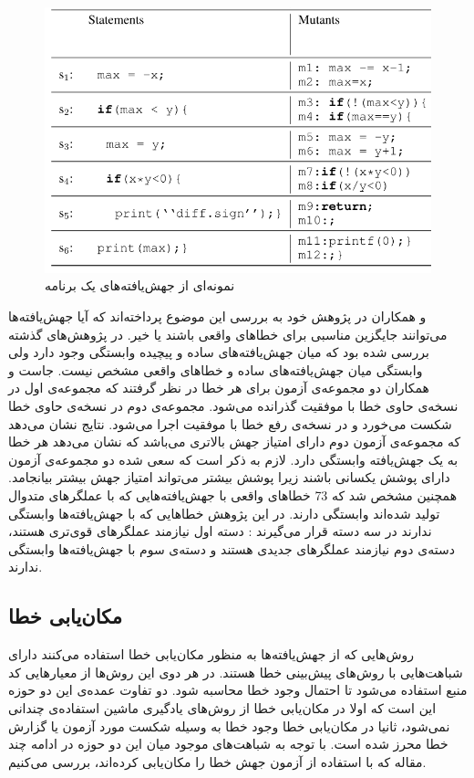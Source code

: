 \begin{figure}[H]
	\centering
	\includegraphics[width=.6\textwidth]{img/mutants.PNG}
	\caption{ نمونه‌ای از جهش‌یافته‌های یک برنامه \cite{moon2014ask}}
	\label{fig:mutant}
\end{figure}
 و همکاران در پژوهش خود به بررسی این موضوع پرداخته‌اند که آیا جهش‌یافته‌ها می‌توانند جایگزین مناسبی برای خطاهای واقعی باشند یا خیر\cite{just2014mutants}. در پژوهش‌های گذشته بررسی شده بود که میان جهش‌یافته‌های ساده و پیچیده وابستگی وجود دارد ولی وابستگی میان جهش‌یافته‌های ساده و خطاهای واقعی مشخص نیست. جاست و همکاران دو مجموعه‌ی آزمون برای هر خطا در نظر گرفتند که مجموعه‌ی اول در نسخه‌ی حاوی خطا با موفقیت گذرانده می‌شود. مجموعه‌ی دوم در نسخه‌ی حاوی خطا شکست می‌خورد و در نسخه‌ی رفع خطا با موفقیت اجرا می‌شود. نتایج نشان می‌دهد که مجموعه‌ی آزمون دوم دارای امتیاز جهش بالاتری می‌باشد که نشان می‌دهد هر خطا به یک جهش‌یافته وابستگی دارد. لازم به ذکر است که سعی شده  دو مجموعه‌ی آزمون دارای پوشش یکسانی باشند زیرا پوشش بیشتر می‌تواند امتیاز جهش بیشتر بیانجامد. همچنین مشخص شد که  
73\lr{\%} 
خطاهای واقعی با جهش‌یافته‌هایی که  با عملگرهای متدوال تولید شده‌اند وابستگی دارند. در این پژوهش خطاهایی که با جهش‌یافته‌ها وابستگی ندارند در سه دسته قرار می‌گیرند : دسته اول نیازمند عملگرهای قوی‌تری هستند، دسته‌ی دوم نیازمند عملگرهای جدیدی هستند و دسته‌ی سوم با جهش‌یافته‌ها وابستگی ندارند.\\
\subsection{مکان‌یابی خطا}
روش‌هایی که از جهش‌یافته‌ها به منظور مکان‌یابی خطا استفاده می‌کنند دارای شباهت‌هایی با روش‌های پیش‌بینی خطا هستند. در هر دوی این روش‌ها از معیارهایی  کد منبع استفاده می‌شود تا احتمال وجود خطا محاسبه شود. دو تفاوت عمده‌ی این دو حوزه این است که اولا در مکان‌یابی خطا از روش‌های یادگیری ماشین استفاده‌ی چندانی نمی‌شود، ثانیا در مکان‌یابی خطا وجود خطا به وسیله شکست مورد آزمون یا گزارش خطا محرز شده است. با توجه به شباهت‌های موجود میان این دو حوزه در ادامه چند مقاله که با استفاده از آزمون جهش خطا را مکان‌یابی کرده‌اند، بررسی می‌کنیم. \\

